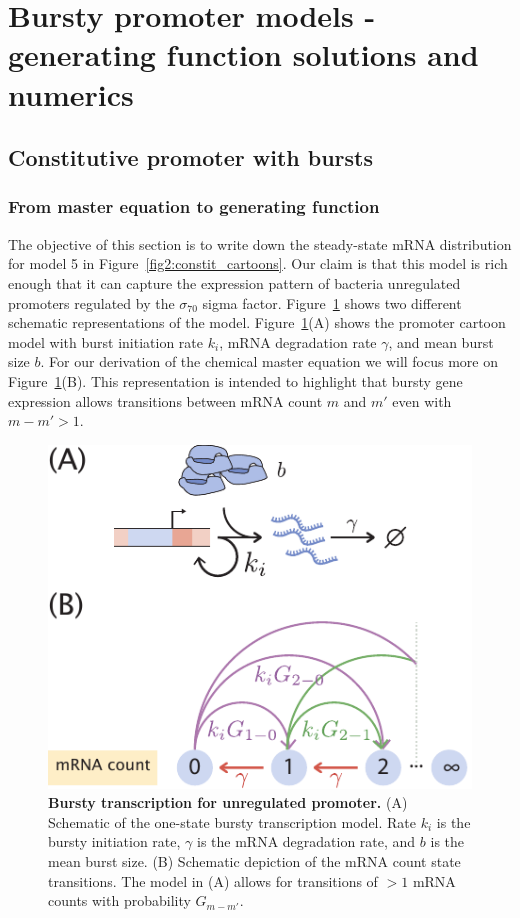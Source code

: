 \section{Bursty promoter models - generating function solutions and numerics}
\label{sec:gen_fcn_appdx}

\subsection{Constitutive promoter with bursts}

\subsubsection{From master equation to generating function}

The objective of this section is to write down the steady-state mRNA
distribution for model 5 in Figure~\ref{fig2:constit_cartoons}. Our claim is
that this model is rich enough that it can capture the expression pattern of
bacteria unregulated promoters regulated by the $\sigma_{70}$ sigma factor.
Figure~\ref{figS1:bursty_one_state} shows two different schematic
representations of the model. Figure~\ref{figS1:bursty_one_state}(A) shows the
promoter cartoon model with burst initiation rate $k_i$, mRNA degradation rate
$\gamma$, and mean burst size $b$. For our derivation of the chemical master
equation we will focus more on Figure~\ref{figS1:bursty_one_state}(B). This
representation is intended to highlight that bursty gene expression allows
transitions between mRNA count $m$ and $m'$ even with $m - m' > 1$.

\begin{figure}[h!]
\centering
\includegraphics{../figures/si/figS0X_bursty_states.pdf}
\caption{
\textbf{Bursty transcription for unregulated promoter.}
(A) Schematic of the one-state bursty transcription model. Rate $k_i$ is the
bursty initiation rate, $\gamma$ is the mRNA degradation rate, and $b$ is the
mean burst size. (B) Schematic depiction of the mRNA count state transitions.
The model in (A) allows for transitions of $> 1$ mRNA counts with probability
$G_{m-m'}$.}
\label{figS1:bursty_one_state}
\end{figure}

